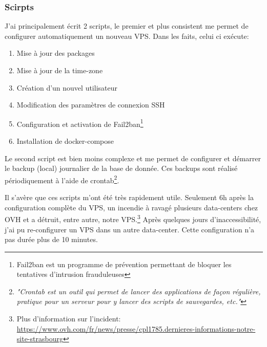 \subsubsection{Scirpts}
J'ai principalement écrit 2 scripts, le premier et plus consistent me permet de configurer automatiquement un nouveau VPS. Dans les faits, celui ci exécute: 
\begin{enumerate}
  \item Mise à jour des packages
  \item Mise à jour de la time-zone
  \item Création d'un nouvel utilisateur
  \item Modification des paramètres de connexion SSH
  \item Configuration et activation de Fail2ban\footnote{Fail2ban est un programme de prévention permettant de bloquer les tentatives d'intrusion frauduleuses}
  \item Installation de docker-compose
\end{enumerate}

\newpara

Le second script est bien moins complexe et me permet de configurer et démarrer le backup (local) journalier de la base de donnée. Ces backups sont réalisé périodiquement à l'aide de crontab\footnote{\textit{"Crontab est un outil qui permet de lancer des applications de façon régulière, pratique pour un serveur pour y lancer des scripts de sauvegardes, etc."}\cite{CRON}}.

\newpara

Il s'avère que ces scripts m'ont été très rapidement utile. Seulement 6h après la configuration complète du VPS, un incendie à ravagé plusieurs data-centers chez OVH et a détruit, entre autre, notre VPS.\footnote{Plus d'information sur l'incident: \url{https://www.ovh.com/fr/news/presse/cpl1785.dernieres-informations-notre-site-strasbourg}} Après quelques jours d'inaccessibilité, j'ai pu re-configurer un VPS dans un autre data-center. Cette configuration n'a pas durée plus de 10 minutes.

\newpage

